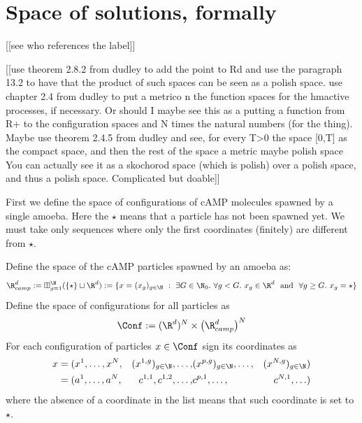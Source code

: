 \section{Space of solutions, formally}\label{app:formal-def-solution}

[[see who references the label]]

[[use theorem 2.8.2 from dudley to add the point to Rd and use the paragraph 13.2 to have that the product of such spaces can be seen as a polish space.
use chapter 2.4 from dudley to put a metrico n the function spaces for the hmactive processes, if necessary.
Or should I maybe see this as a putting a function from R+ to the configuration spaces and N times the natural numbers (for the thing).
Maybe use theorem 2.4.5 from dudley and see, for every T>0 the space [0,T] as the compact space, and then the rest of the space a metric maybe polish space
You can actually see it as a skochorod space (which is polish) over a polish space, and thus a polish space. Complicated but doable]]

First we define the space of configurations of cAMP molecules spawned by a single amoeba.
Here the $\star$ means that a particle has not been spawned yet.
We must take only sequences where only the first coordinates (finitely) are different from $\star$.

\begin{definition}
Define the space of the cAMP particles spawned by an amoeba as:
\begin{equation}
\R^d_{camp}:=\boxplus_{g=1}^\N (\{\star\} \sqcup \R^d) := 
\{
	x = (x_g)_{g\in\N}\
	:\
	\exists G\in\N_0.\
	\forall g < G.\
	x_g \in \R^d\
	\text{ and }\
	\forall g\geq G.\
	x_g =\star
\}
\end{equation}
Define the space of configurations for all particles as
\begin{equation}
\Conf:=(\R^d)^N \times\big(\R^d_{camp}\big)^N
\end{equation}
For each configuration of particles $x\in \Conf$ sign its coordinates as 
\begin{equation*}
\begin{aligned}
x &= (x^1, \ldots, x^N, 
	&(x^{1,g})_{g\in\N}, \ldots, 
	&(x^{p,g})_{g\in\N}, \ldots, 
	&(x^{N,g})_{g\in\N})
\\
&= (a^1, \ldots, a^N, 
	&c^{1,1}, c^{1,2}, \ldots, 
	&c^{p,1},\ldots, 
	&c^{N,1}, \ldots)
\end{aligned}
\end{equation*}
where the absence of a coordinate in the list means that such coordinate is set to $\star$.
\end{definition}

